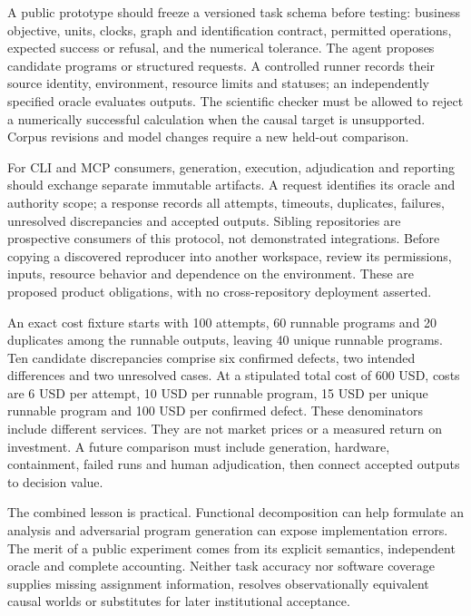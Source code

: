 A public prototype should freeze a versioned task schema before testing: business objective, units, clocks, graph and identification contract, permitted operations, expected success or refusal, and the numerical tolerance. The agent proposes candidate programs or structured requests. A controlled runner records their source identity, environment, resource limits and statuses; an independently specified oracle evaluates outputs. The scientific checker must be allowed to reject a numerically successful calculation when the causal target is unsupported. Corpus revisions and model changes require a new held-out comparison.\citep{exec24_affordance_fuzzing_reference}

For CLI and MCP consumers, generation, execution, adjudication and reporting should exchange separate immutable artifacts. A request identifies its oracle and authority scope; a response records all attempts, timeouts, duplicates, failures, unresolved discrepancies and accepted outputs. Sibling repositories are prospective consumers of this protocol, not demonstrated integrations. Before copying a discovered reproducer into another workspace, review its permissions, inputs, resource behavior and dependence on the environment. These are proposed product obligations, with no cross-repository deployment asserted.\citep{exec24_affordance_fuzzing_reference}

An exact cost fixture starts with 100 attempts, 60 runnable programs and 20 duplicates among the runnable outputs, leaving 40 unique runnable programs. Ten candidate discrepancies comprise six confirmed defects, two intended differences and two unresolved cases. At a stipulated total cost of 600 USD, costs are 6 USD per attempt, 10 USD per runnable program, 15 USD per unique runnable program and 100 USD per confirmed defect. These denominators include different services. They are not market prices or a measured return on investment. A future comparison must include generation, hardware, containment, failed runs and human adjudication, then connect accepted outputs to decision value.\citep{exec24_affordance_fuzzing_reference}

The combined lesson is practical. Functional decomposition can help formulate an analysis and adversarial program generation can expose implementation errors. The merit of a public experiment comes from its explicit semantics, independent oracle and complete accounting. Neither task accuracy nor software coverage supplies missing assignment information, resolves observationally equivalent causal worlds or substitutes for later institutional acceptance.\citep{exec24_affordance_fuzzing_reference}
